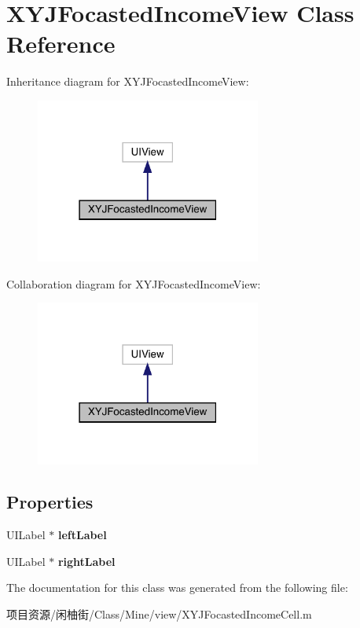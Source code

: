 \hypertarget{interface_x_y_j_focasted_income_view}{}\section{X\+Y\+J\+Focasted\+Income\+View Class Reference}
\label{interface_x_y_j_focasted_income_view}


Inheritance diagram for X\+Y\+J\+Focasted\+Income\+View\+:\nopagebreak
\begin{figure}[H]
\begin{center}
\leavevmode
\includegraphics[width=210pt]{interface_x_y_j_focasted_income_view__inherit__graph}
\end{center}
\end{figure}


Collaboration diagram for X\+Y\+J\+Focasted\+Income\+View\+:\nopagebreak
\begin{figure}[H]
\begin{center}
\leavevmode
\includegraphics[width=210pt]{interface_x_y_j_focasted_income_view__coll__graph}
\end{center}
\end{figure}
\subsection*{Properties}
\begin{DoxyCompactItemize}
\item 
\mbox{\label{interface_x_y_j_focasted_income_view_ab85c96d97e04f97d94197926668dc9ea}} 
U\+I\+Label $\ast$ {\bfseries left\+Label}
\item 
\mbox{\label{interface_x_y_j_focasted_income_view_ab6bd5e5c5cf0864733b94154dbfe105c}} 
U\+I\+Label $\ast$ {\bfseries right\+Label}
\end{DoxyCompactItemize}


The documentation for this class was generated from the following file\+:\begin{DoxyCompactItemize}
\item 
项目资源/闲柚街/\+Class/\+Mine/view/X\+Y\+J\+Focasted\+Income\+Cell.\+m\end{DoxyCompactItemize}

